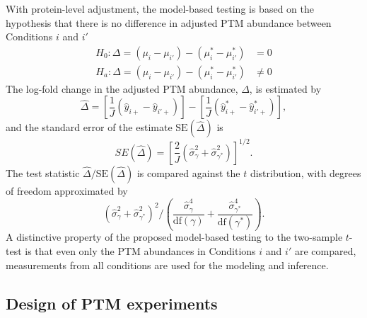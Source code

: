 \documentclass{mcp}
\begin{document}
With protein-level adjustment, the model-based testing is based on the hypothesis that there is no difference in adjusted PTM abundance between Conditions $i$ and $i'$
\begin{align*}
H_{0}: \Delta = \left( \mu_{i} - \mu_{i'} \right) - \left( \mu_{i}^{\ast} - \mu_{i'}^{\ast} \right) &= 0 \\
H_{a}: \Delta = \left( \mu_{i} - \mu_{i'} \right) - \left( \mu_{i}^{\ast} - \mu_{i'}^{\ast} \right) &\neq 0
\end{align*}
The log-fold change in the adjusted PTM abundance, $\Delta$, is estimated by 
\[
\hat{\Delta} = \left[ \frac{1}{J} \left( \hat{y}_{i+} - \hat{y}_{i'+} \right) \right] - \left[ \frac{1}{J} \left( \hat{y}_{i+}^{\ast} - \hat{y}_{i'+}^{\ast} \right) \right],
\]
and the standard error of the estimate $\mathrm{SE}(\hat{\Delta})$ is 
\[
SE(\hat{\Delta}) = \left[ \frac{2}{J} \left( \hat{\sigma}_{\gamma}^{2} + \hat{\sigma}_{\gamma^{\ast}}^{2} \right) \right]^{1/2}.
\]
The test statistic $\hat{\Delta} / \mathrm{SE}(\hat{\Delta})$ is compared against the $t$ distribution, with degrees of freedom approximated by
\[
\left( \hat{\sigma}_{\gamma}^{2} + \hat{\sigma}_{\gamma^{\ast}}^{2} \right)^2 \bigg/
\left( \frac{\hat{\sigma}_{\gamma}^{4}}{\mathrm{df}(\gamma)} + \frac{\hat{\sigma}_{\gamma^{\ast}}^{4}}{ \mathrm{df}(\gamma^{\ast})} \right).
\]
A distinctive property of the proposed model-based testing to the two-sample $t$-test is that even only the PTM abundances in Conditions $i$ and $i'$ are compared, measurements from all conditions are used for the modeling and inference. 


\subsection{Design of PTM experiments}
\label{sec:design}
\end{document}
